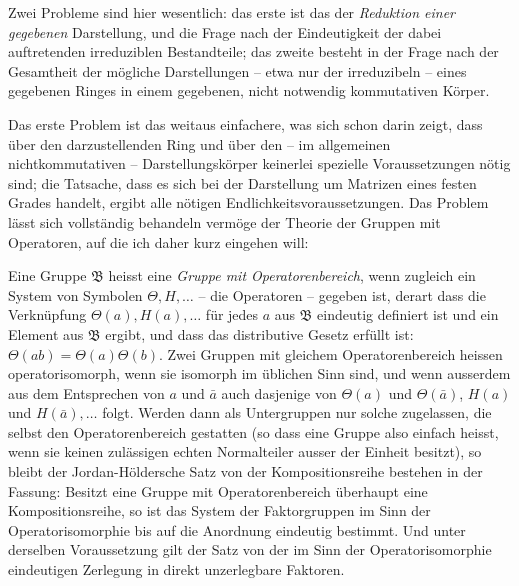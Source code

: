 Zwei Probleme sind hier wesentlich: das erste ist das der \emph{Reduktion einer gegebenen} Darstellung, und die Frage nach der Eindeutigkeit der dabei auftretenden irreduziblen Bestandteile; das zweite besteht in der Frage nach der Gesamtheit der mögliche Darstellungen -- etwa nur der irreduzibeln -- eines gegebenen Ringes in einem gegebenen, nicht notwendig kommutativen Körper.

Das erste Problem ist das weitaus einfachere, was sich schon darin zeigt, dass über den darzustellenden Ring und über den -- im allgemeinen nichtkommutativen -- Darstellungskörper keinerlei spezielle Voraussetzungen nötig sind; die Tatsache, dass es sich bei der Darstellung um Matrizen eines festen Grades handelt, ergibt alle nötigen Endlichkeitsvoraussetzungen. Das Problem lässt sich vollständig behandeln vermöge der Theorie der Gruppen mit Operatoren, auf die ich daher kurz eingehen will:

Eine Gruppe $\mathfrak{B}$ heisst eine \emph{Gruppe mit Operatorenbereich}, wenn zugleich ein System von Symbolen $\Theta,H,\ldots$ -- die Operatoren -- gegeben ist, derart dass die Verknüpfung $\Theta(a),H(a),\ldots$ für jedes $a$ aus $\mathfrak{B}$ eindeutig definiert ist und ein Element aus $\mathfrak{B}$ ergibt, und dass das distributive Gesetz erfüllt ist: $\Theta(ab)=\Theta(a)\Theta(b)$. Zwei Gruppen mit gleichem Operatorenbereich heissen operatorisomorph, wenn sie isomorph im üblichen Sinn sind, und wenn ausserdem aus dem Entsprechen von $a$ und $\bar a$ auch dasjenige von $\Theta(a)$ und $\Theta(\bar a)$, $H(a)$ und $H(\bar a),\ldots$ folgt. Werden dann als Untergruppen nur solche zugelassen, die selbst den Operatorenbereich gestatten (so dass eine Gruppe also einfach heisst, wenn sie keinen zulässigen echten Normalteiler ausser der Einheit besitzt), so bleibt der Jordan-Höldersche Satz von der Kompositionsreihe bestehen in der Fassung: Besitzt eine Gruppe mit Operatorenbereich überhaupt eine Kompositionsreihe, so ist das System der Faktorgruppen im Sinn der Operatorisomorphie bis auf die Anordnung eindeutig bestimmt. Und unter derselben Voraussetzung gilt der Satz von der im Sinn der Operatorisomorphie eindeutigen Zerlegung in direkt unzerlegbare Faktoren.


